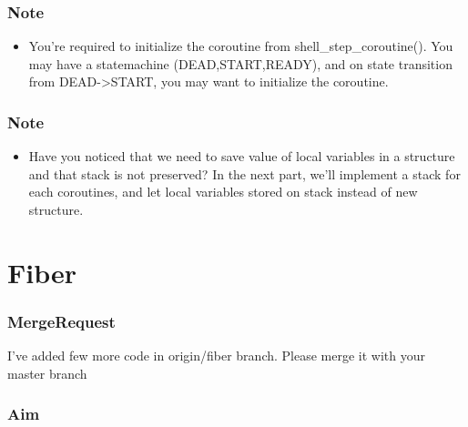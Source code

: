 \documentclass[]{book}
\newenvironment{Shaded}{}{}
\newcommand{\KeywordTok}[1]{\textbf{{#1}}}
\newcommand{\NormalTok}[1]{{#1}}
\begin{document}
\subsubsection*{Note}\label{note-5}

\begin{itemize}
\itemsep1pt\parskip0pt
\item
  You're required to initialize the coroutine from
  shell\_step\_coroutine(). You may have a statemachine
  (DEAD,START,READY), and on state transition from
  DEAD-\textgreater{}START, you may want to initialize the coroutine.
\end{itemize}

\subsubsection*{Note}\label{note-6}

\begin{itemize}
\itemsep1pt\parskip0pt
\item
  Have you noticed that we need to save value of local variables in a
  structure and that stack is not preserved? In the next part, we'll
  implement a stack for each coroutines, and let local variables stored
  on stack instead of new structure.
\end{itemize}

\section{Fiber}\label{fiber}

\subsubsection*{MergeRequest}\label{mergerequest-5}

I've added few more code in origin/fiber branch. Please merge it with
your master branch

\begin{Shaded}
\end{Shaded}

\subsubsection*{Aim}\label{aim-5}
\end{document}
